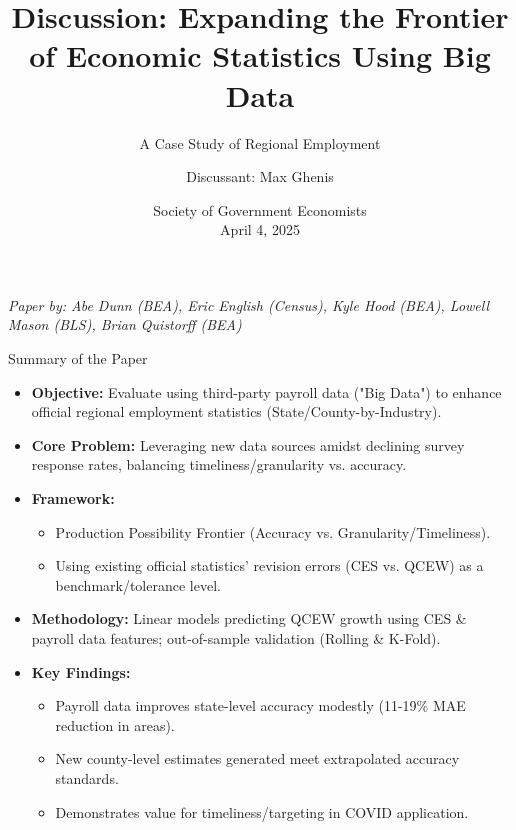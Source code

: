 \documentclass{beamer}
\title{Discussion: Expanding the Frontier of Economic Statistics Using Big Data}
\subtitle{A Case Study of Regional Employment}
\author[Max Ghenis]{Discussant: Max Ghenis} %
\institute{PolicyEngine} %
\date{Society of Government Economists\\April 4, 2025} %
\begin{document}
\begin{frame}
    \titlepage
    \vspace{0.5cm}
    \tiny{\textit{Paper by: Abe Dunn (BEA), Eric English (Census), Kyle Hood (BEA), Lowell Mason (BLS), Brian Quistorff (BEA)}}
\end{frame}

\begin{frame}{Summary of the Paper}
    \begin{itemize}
        \item \textbf{Objective:} Evaluate using third-party payroll data ("Big Data") to enhance official regional employment statistics (State/County-by-Industry).
        \item \textbf{Core Problem:} Leveraging new data sources amidst declining survey response rates, balancing timeliness/granularity vs. accuracy.
        \item \textbf{Framework:}
        \begin{itemize}
            \item Production Possibility Frontier (Accuracy vs. Granularity/Timeliness).
            \item Using existing official statistics' revision errors (CES vs. QCEW) as a benchmark/tolerance level.
        \end{itemize}
        \item \textbf{Methodology:} Linear models predicting QCEW growth using CES \& payroll data features; out-of-sample validation (Rolling \& K-Fold).
        \item \textbf{Key Findings:}
        \begin{itemize}
            \item Payroll data improves state-level accuracy modestly (11-19\% MAE reduction in areas).
            \item New county-level estimates generated meet extrapolated accuracy standards.
            \item Demonstrates value for timeliness/targeting in COVID application.
        \end{itemize}
    \end{itemize}
\end{frame}
\end{document}
